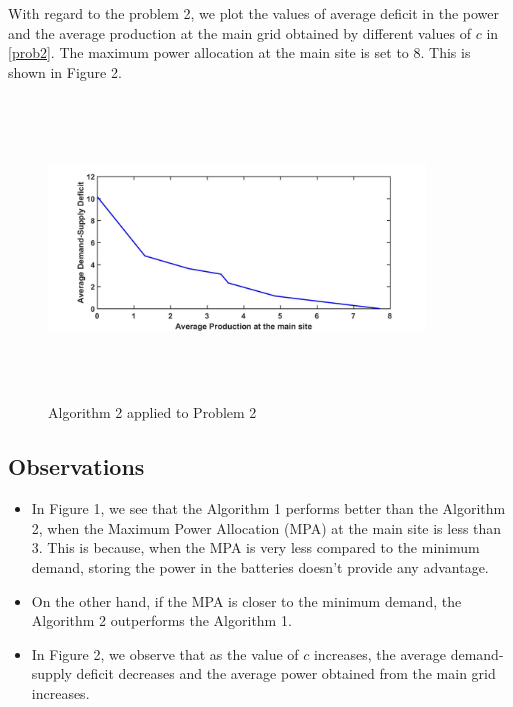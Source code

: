 \documentclass[conference]{IEEEtran}
\begin{document}
With regard to the problem 2, we plot the values of average deficit in the power and the average production at the main grid obtained by different values of $c$ in \eqref{prob2}. The maximum power allocation at the main site is set to 8. This is shown in Figure 2. 

\begin{figure}[]
\begin{center}
 \includegraphics[width = 10cm, height = 8cm]{plot2.jpg}
 \caption{Algorithm 2 applied to Problem 2}
 \end{center}
 \end{figure}

\subsection{Observations}

\begin{itemize}
\item In Figure 1, we see that the Algorithm 1 performs better than the Algorithm 2, when the Maximum Power Allocation (MPA) at the main site is less than 3. This is because, when the MPA is very less compared to the minimum demand, storing the power in the batteries doesn't provide any advantage. 
\item On the other hand, if the MPA is closer to the minimum demand, the Algorithm 2 outperforms the Algorithm 1. 
\item In Figure 2, we observe that as the value of $c$ increases, the average demand-supply deficit decreases and the average power obtained from the main grid increases. 
\end{itemize}
\end{document}
